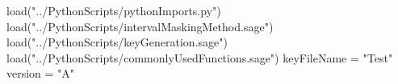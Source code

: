 \documentclass[14pt]{extbook}
\begin{document}
\begin{sagesilent}
load("../PythonScripts/pythonImports.py")
load("../PythonScripts/intervalMaskingMethod.sage")
load("../PythonScripts/keyGeneration.sage")
load("../PythonScripts/commonlyUsedFunctions.sage")
keyFileName = "Test"
version = "A"
\end{sagesilent}

\begin{enumerate}
\end{enumerate} \n \n 
\end{document}
